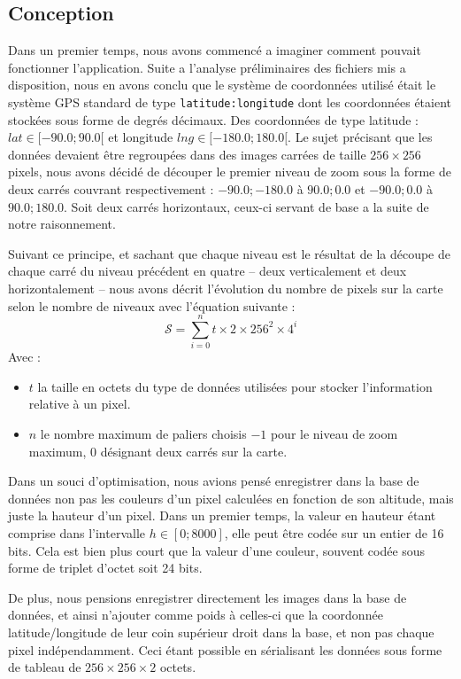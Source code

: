 \documentclass[a4paper]{article}
\begin{document}
\subsection{Conception}
	Dans un premier temps, nous avons commencé a imaginer comment pouvait fonctionner l'application.
Suite a l'analyse préliminaires des fichiers mis a disposition, nous en avons conclu que le système de coordonnées utilisé était le système GPS standard de type \texttt{latitude:longitude} dont les coordonnées étaient stockées sous forme de degrés décimaux. Des coordonnées de type latitude : $lat \in [-90.0; 90.0[$ et longitude $lng \in [-180.0; 180.0[$.
Le sujet précisant que les données devaient être regroupées dans des images carrées de taille $256 \times 256$ pixels, nous avons décidé de découper le premier niveau de zoom sous la forme de deux carrés couvrant respectivement : $-90.0;-180.0$ à $90.0;0.0$ et $-90.0;0.0$ à $90.0;180.0$. Soit deux carrés horizontaux, ceux-ci servant de base a la suite de notre raisonnement.

	Suivant ce principe, et sachant que chaque niveau est le résultat de la découpe de chaque carré du niveau précédent en quatre -- deux verticalement et deux horizontalement -- nous avons décrit l'évolution du nombre de pixels sur la carte selon le nombre de niveaux avec l'équation suivante :
$$\mathcal{S} = \sum_{i=0}^{n} t \times 2 \times 256^{2} \times 4^{i}$$
Avec :
\begin{itemize}
\item $t$ la taille en octets du type de données utilisées pour stocker l'information relative à un pixel.
\item $n$ le nombre maximum de paliers choisis $-1$ pour le niveau de zoom maximum, $0$ désignant deux carrés sur la carte.
\end{itemize}

	Dans un souci d’optimisation, nous avions pensé enregistrer dans la base de données non pas les couleurs d'un pixel calculées en fonction de son altitude, mais juste la hauteur d'un pixel. Dans un premier temps, la valeur en hauteur étant comprise dans l'intervalle $h \in [0;8000]$, elle peut être codée sur un entier de 16 bits. Cela est bien plus court que la valeur d'une couleur, souvent codée sous forme de triplet d'octet soit 24 bits.
    
De plus, nous pensions enregistrer directement les images dans la base de données, et ainsi n'ajouter comme poids à celles-ci que la coordonnée latitude/longitude de leur coin supérieur droit dans la base, et non pas chaque pixel indépendamment. Ceci étant possible en sérialisant les données sous forme de tableau de $256 \times 256 \times 2$ octets.
\end{document}
